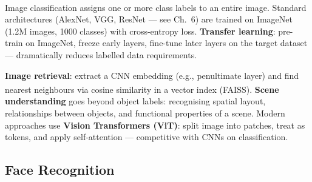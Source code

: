 \begin{tcbitemize}[ skin=sectionraster ]
    \tcbitem[title={CNN Classifiers and Transfer Learning}, raster multicolumn=3]
    Image classification assigns one or more class labels to an entire image\textsuperscript{\cite[][p.~104]{fleuretLittleBookDeep}}.
    Standard architectures (AlexNet, VGG, ResNet --- see Ch.~6) are trained on ImageNet (1.2M images, 1000 classes) with cross-entropy loss.
    \textbf{Transfer learning}: pre-train on ImageNet, freeze early layers, fine-tune later layers on the target dataset --- dramatically reduces labelled data requirements.

    \tcbitem[title={Image Retrieval and Scene Understanding}, raster multicolumn=3]
    \textbf{Image retrieval}: extract a CNN embedding (e.g., penultimate layer) and find nearest neighbours via cosine similarity in a vector index (FAISS)\textsuperscript{\cite[][p.~104]{fleuretLittleBookDeep}}.
    \textbf{Scene understanding} goes beyond object labels: recognising spatial layout, relationships between objects, and functional properties of a scene.
    Modern approaches use \textbf{Vision Transformers (ViT)}: split image into patches, treat as tokens, and apply self-attention --- competitive with CNNs on classification.
\end{tcbitemize}

\subsection{Face Recognition}

